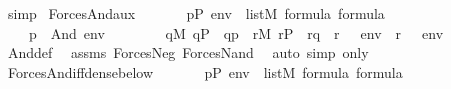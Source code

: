 \begin{isabellebody}
\ simp%
\endisatagproof
{\isafoldproof}%
%
\isadelimproof
\isanewline
%
\endisadelimproof
\isanewline
{}\isamarkupfalse%
\ Forces{\isacharunderscore}{\kern0pt}And{\isacharunderscore}{\kern0pt}aux{\isacharcolon}{\kern0pt}\isanewline
\ \ \isanewline
\ \ \ \ {\isachardoublequoteopen}p{\isasymin}P{\isachardoublequoteclose}\ {\isachardoublequoteopen}env\ {\isasymin}\ list{\isacharparenleft}{\kern0pt}M{\isacharparenright}{\kern0pt}{\isachardoublequoteclose}\ {\isachardoublequoteopen}{\isasymphi}{\isasymin}formula{\isachardoublequoteclose}\ {\isachardoublequoteopen}{\isasympsi}{\isasymin}formula{\isachardoublequoteclose}\isanewline
\ \ \isanewline
\ \ \ \ {\isachardoublequoteopen}p\ {\isasymtturnstile}\ And{\isacharparenleft}{\kern0pt}{\isasymphi}{\isacharcomma}{\kern0pt}{\isasympsi}{\isacharparenright}{\kern0pt}\ env\ \ \ {\isasymlongleftrightarrow}\ \isanewline
\ \ \ \ {\isacharparenleft}{\kern0pt}{\isasymforall}q{\isasymin}M{\isachardot}{\kern0pt}\ q{\isasymin}P\ {\isasymand}\ q{\isasympreceq}p\ {\isasymlongrightarrow}\ {\isacharparenleft}{\kern0pt}{\isasymexists}r{\isasymin}M{\isachardot}{\kern0pt}\ r{\isasymin}P\ {\isasymand}\ r{\isasympreceq}q\ {\isasymand}\ {\isacharparenleft}{\kern0pt}r\ {\isasymtturnstile}\ {\isasymphi}\ env{\isacharparenright}{\kern0pt}\ {\isasymand}\ {\isacharparenleft}{\kern0pt}r\ {\isasymtturnstile}\ {\isasympsi}\ env{\isacharparenright}{\kern0pt}{\isacharparenright}{\kern0pt}{\isacharparenright}{\kern0pt}{\isachardoublequoteclose}\isanewline
%
\isadelimproof
\ \ %
\endisadelimproof
%
\isatagproof
{}\isamarkupfalse%
\ And{\isacharunderscore}{\kern0pt}def\ \isamarkupfalse%
\ assms\ Forces{\isacharunderscore}{\kern0pt}Neg\ Forces{\isacharunderscore}{\kern0pt}Nand\ \isamarkupfalse%
\ {\isacharparenleft}{\kern0pt}auto\ simp\ only{\isacharcolon}{\kern0pt}{\isacharparenright}{\kern0pt}%
\endisatagproof
{\isafoldproof}%
%
\isadelimproof
\isanewline
%
\endisadelimproof
\isanewline
{}\isamarkupfalse%
\ Forces{\isacharunderscore}{\kern0pt}And{\isacharunderscore}{\kern0pt}iff{\isacharunderscore}{\kern0pt}dense{\isacharunderscore}{\kern0pt}below{\isacharcolon}{\kern0pt}\isanewline
\ \ \isanewline
\ \ \ \ {\isachardoublequoteopen}p{\isasymin}P{\isachardoublequoteclose}\ {\isachardoublequoteopen}env\ {\isasymin}\ list{\isacharparenleft}{\kern0pt}M{\isacharparenright}{\kern0pt}{\isachardoublequoteclose}\ {\isachardoublequoteopen}{\isasymphi}{\isasymin}formula{\isachardoublequoteclose}\ {\isachardoublequoteopen}{\isasympsi}{\isasymin}formula{\isachardoublequoteclose}\isanewline

\end{isabellebody}
